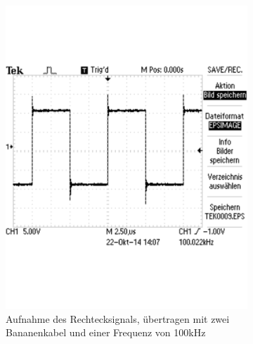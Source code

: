 \documentclass[12pt,a4paper]{article}
\begin{document}
\begin{figure}[H]
        \centering
        \begin{subfigure}[tb]{0.48\textwidth}
                \includegraphics[width=\textwidth , scale = 0.4]{2_3_vgl_2.pdf}
				\caption[Aufnahme des Rechtecksignals, übertragen mit zwei Bananenkabel und einer Frequenz von 100kHz]{Aufnahme des Rechtecksignals, übertragen mit zwei Bananenkabel und einer Frequenz von 100kHz}
 				\label{fig:2_3_vgl_2}
        \end{subfigure}%
        \hfill
        \begin{subfigure}[tb]{0.48\textwidth}

\end{subfigure}
\end{figure}
\end{document}
